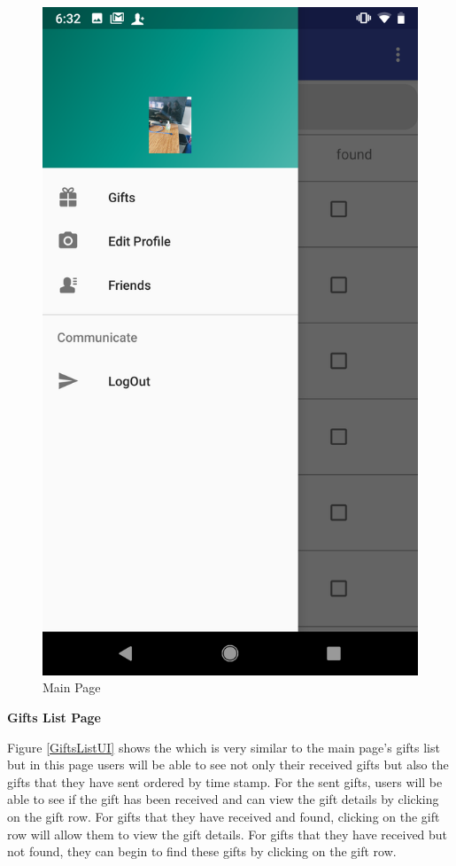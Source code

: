 \begin{figure}[htb]
\begin{minipage}[t]{0.45\textwidth}
\includegraphics[width=.95\textwidth]{section03/assets/MainPortrait.png}
\subcaption{\label{FunctionsMainUI}}
\end{minipage}%
\caption[Main Page]{\label{MainPageUI}Main Page}
\end{figure}

\textbf{Gifts List Page}

\par Figure \ref{GiftsListUI} shows the  which is very similar to the main page's gifts list but in this page users will be able to see not only their received gifts but also the gifts that they have sent ordered by time stamp. For the sent gifts, users will be able to see if the gift has been received and can view the gift details by clicking on the gift row. For gifts that they have received and found, clicking on the gift row will allow them to view the gift details.  For gifts that they have received but not found, they can begin to find these gifts by clicking on the gift row. 

